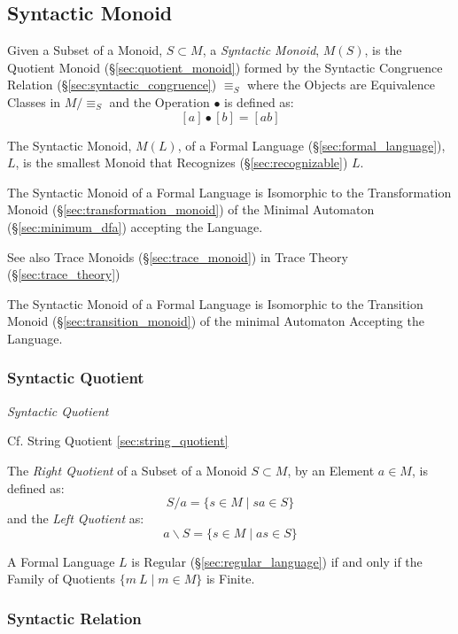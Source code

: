 \subsection{Syntactic Monoid}\label{sec:syntactic_monoid}

Given a Subset of a Monoid, $S \subset M$, a \emph{Syntactic Monoid},
$M(S)$, is the Quotient Monoid (\S\ref{sec:quotient_monoid}) formed by
the Syntactic Congruence Relation (\S\ref{sec:syntactic_congruence})
$\equiv_S$ where the Objects are Equivalence Classes in $M / \equiv_S$
and the Operation $\bullet$ is defined as:
\[
  [a] \bullet [b] = [ab]
\]

The Syntactic Monoid, $M(L)$, of a Formal Language
(\S\ref{sec:formal_language}), $L$, is the smallest Monoid that
Recognizes (\S\ref{sec:recognizable}) $L$.

The Syntactic Monoid of a Formal Language is Isomorphic to the
Transformation Monoid (\S\ref{sec:transformation_monoid}) of the
Minimal Automaton (\S\ref{sec:minimum_dfa}) accepting the Language.

\fist See also Trace Monoids (\S\ref{sec:trace_monoid}) in Trace
Theory (\S\ref{sec:trace_theory})

The Syntactic Monoid of a Formal Language is Isomorphic to the
Transition Monoid (\S\ref{sec:transition_monoid}) of the minimal
Automaton Accepting the Language.



\subsubsection{Syntactic Quotient}\label{sec:syntactic_quotient}

\emph{Syntactic Quotient}

\fist Cf. String Quotient \ref{sec:string_quotient}

The \emph{Right Quotient} of a Subset of a Monoid $S \subset M$, by an
Element $a \in M$, is defined as:
\[
  S / a = \{ s \in M\;|\;sa \in S \}
\]
and the \emph{Left Quotient} as:
\[
  a \backslash S = \{ s \in M\;|\;as \in S \}
\]

A Formal Language $L$ is Regular (\S\ref{sec:regular_language}) if and
only if the Family of Quotients $\{ m \ L \;|\; m \in M \}$ is Finite.



\subsubsection{Syntactic Relation}\label{sec:syntactic_relation}

